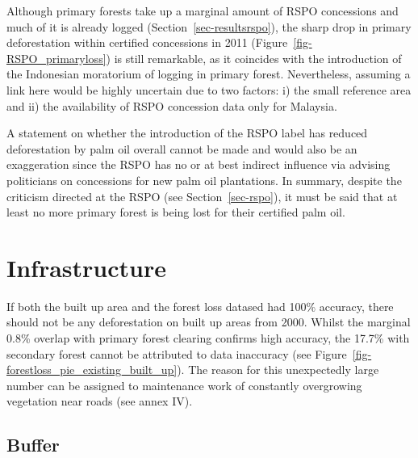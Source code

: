 \documentclass[
  letterpaper,
  DIV=11,
  numbers=noendperiod]{scrreprt}
\begin{document}
Although primary forests take up a marginal amount of RSPO concessions
and much of it is already logged (Section~\ref{sec-resultsrspo}), the
sharp drop in primary deforestation within certified concessions in 2011
(Figure~\ref{fig-RSPO_primaryloss}) is still remarkable, as it coincides
with the introduction of the Indonesian moratorium of logging in primary
forest. Nevertheless, assuming a link here would be highly uncertain due
to two factors: i) the small reference area and ii) the availability of
RSPO concession data only for Malaysia.

A statement on whether the introduction of the RSPO label has reduced
deforestation by palm oil overall cannot be made and would also be an
exaggeration since the RSPO has no or at best indirect influence via
advising politicians on concessions for new palm oil plantations. In
summary, despite the criticism directed at the RSPO (see
Section~\ref{sec-rspo}), it must be said that at least no more primary
forest is being lost for their certified palm oil.

\hypertarget{infrastructure-2}{%
\section{Infrastructure}\label{infrastructure-2}}

If both the built up area and the forest loss datased had 100\%
accuracy, there should not be any deforestation on built up areas from
2000. Whilst the marginal 0.8\% overlap with primary forest clearing
confirms high accuracy, the 17.7\% with secondary forest cannot be
attributed to data inaccuracy (see
Figure~\ref{fig-forestloss_pie_existing_built_up}). The reason for this
unexpectedly large number can be assigned to maintenance work of
constantly overgrowing vegetation near roads (see annex IV).

\hypertarget{buffer}{%
\subsection{Buffer}\label{buffer}}
\end{document}

